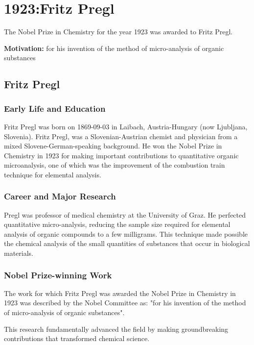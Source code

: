 \chapter{1923:Fritz Pregl}
\label{chap:chemistry1923}

The Nobel Prize in Chemistry for the year 1923 was awarded to Fritz Pregl.

\textbf{Motivation:}
for his invention of the method of micro-analysis of organic substances

\section{Fritz Pregl}

\subsection*{Early Life and Education}

Fritz Pregl was born on 1869-09-03 in Laibach, Austria-Hungary (now Ljubljana, Slovenia).
Fritz Pregl, was a Slovenian-Austrian chemist and physician from a mixed Slovene-German-speaking background. He won the Nobel Prize in Chemistry in 1923 for making important contributions to quantitative organic microanalysis, one of which was the improvement of the combustion train technique for elemental analysis.

\subsection*{Career and Major Research}

Pregl was professor of medical chemistry at the University of Graz. He perfected quantitative micro-analysis, reducing the sample size required for elemental analysis of organic compounds to a few milligrams. This technique made possible the chemical analysis of the small quantities of substances that occur in biological materials.

\subsection*{Nobel Prize-winning Work}

The work for which Fritz Pregl was awarded the Nobel Prize in Chemistry in 1923 was described by the Nobel Committee as: "for his invention of the method of micro-analysis of organic substances".

This research fundamentally advanced the field by making groundbreaking contributions that transformed chemical science.

